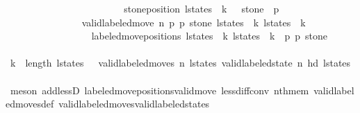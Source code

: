 \begin{isabellebody}
\ \ \ \ \ \ \ \ \ \ \isamarkupfalse%
{\isacharminus}\isanewline
\ \ \ \ \ \ \ \ \ \ \ \ \isamarkupfalse%
\ {\isachardoublequoteopen}stone{\isacharunderscore}position\ {\isacharparenleft}l{\isacharunderscore}states\ {\isacharbang}\ {\isacharparenleft}k\ {\isacharplus}\ {}{\isacharparenright}{\isacharparenright}\ stone\ {\isacharequal}\ p{}{\isacharprime}{\isachardoublequoteclose}\isanewline
\ \ \ \ \ \ \ \ \ \ \ \ \isamarkupfalse%
{\isacharminus}\isanewline
\ \ \ \ \ \ \ \ \ \ \ \ \ \ \isamarkupfalse%
\ {\isachardoublequoteopen}valid{\isacharunderscore}labeled{\isacharunderscore}move{\isacharprime}\ n\ p{}{\isacharprime}\ p{}{\isacharprime}\ stone\ {\isacharparenleft}l{\isacharunderscore}states\ {\isacharbang}\ k{\isacharparenright}\ {\isacharparenleft}l{\isacharunderscore}states\ {\isacharbang}\ {\isacharparenleft}k{\isacharplus}{}{\isacharparenright}{\isacharparenright}{\isachardoublequoteclose}\isanewline
\ \ \ \ \ \ \ \ \ \ \ \ \ \ \ \ \isamarkupfalse%
\ {\isacharbackquoteopen}labeled{\isacharunderscore}move{\isacharunderscore}positions\ {\isacharparenleft}l{\isacharunderscore}states\ {\isacharbang}\ k{\isacharparenright}\ {\isacharparenleft}l{\isacharunderscore}states\ {\isacharbang}\ {\isacharparenleft}k{\isacharplus}{}{\isacharparenright}{\isacharparenright}\ {\isacharequal}\ {\isacharparenleft}p{}{\isacharprime}{\isacharcomma}\ p{}{\isacharprime}{\isacharcomma}\ stone{\isacharparenright}{\isacharbackquoteclose}\isanewline
\ \ \ \ \ \ \ \ \ \ \ \ \ \ \ \ \isamarkupfalse%
\ {\isacartoucheopen}k\ {\isacharless}\ length\ l{\isacharunderscore}states\ {\isacharminus}\ {}{\isacartoucheclose}\ {\isacartoucheopen}valid{\isacharunderscore}labeled{\isacharunderscore}moves\ n\ l{\isacharunderscore}states{\isacartoucheclose}\ {\isacartoucheopen}valid{\isacharunderscore}labeled{\isacharunderscore}state\ n\ {\isacharparenleft}hd\ l{\isacharunderscore}states{\isacharparenright}{\isacartoucheclose}\ \isanewline
\ \ \ \ \ \ \ \ \ \ \ \ \ \ \ \ \isamarkupfalse%
\ {\isacharparenleft}meson\ add{\isacharunderscore}lessD{}\ labeled{\isacharunderscore}move{\isacharunderscore}positions{\isacharunderscore}valid{\isacharunderscore}move{\isacharprime}\ less{\isacharunderscore}diff{\isacharunderscore}conv\ nth{\isacharunderscore}mem\ valid{\isacharunderscore}labeled{\isacharunderscore}moves{\isacharunderscore}def\ valid{\isacharunderscore}labeled{\isacharunderscore}moves{\isacharunderscore}valid{\isacharunderscore}labeled{\isacharunderscore}states{\isacharparenright}\isanewline

\end{isabellebody}
